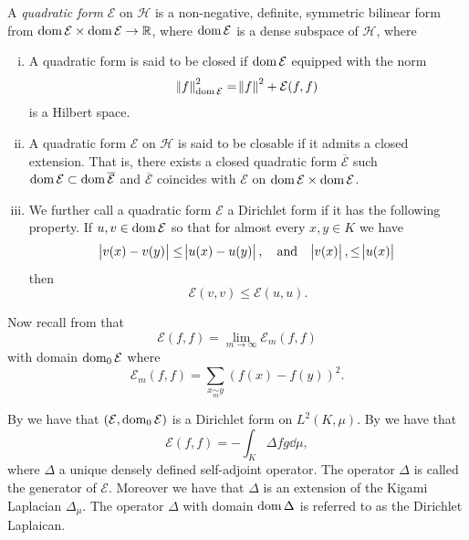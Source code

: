  \medskip
\begin{defi} A \emph{quadratic form} $\mathcal{E}$ on $\mathcal{H}$ is a non-negative, definite, symmetric bilinear form from $\operatorname{dom} \mathcal{E} \times \operatorname{dom} \mathcal{E} \to \mathbb{R}$, where $\operatorname{dom} \mathcal{E}$ is a dense subspace of $\mathcal{H}$, where
	
	\begin{enumerate}[(i)]		
		\item A quadratic form is said to be closed if $\operatorname{dom} \mathcal{E}$ equipped with the norm
		\begin{equation}
			\norm{f}^{2}_{\operatorname{dom} \mathcal{E}} = \norm{f}^2 + \mathcal{E}(f,f)
		\end{equation}
		is a Hilbert space.
		\item A quadratic form $\mathcal{E}$ on $\mathcal{H}$ is said to be closable if it admits a closed extension. That is, there exists a closed quadratic form $\overline{\mathcal{E}}$ such $\operatorname{dom} \mathcal{E} \subset \operatorname{dom} \overline{\mathcal{E}}$ and $\overline{\mathcal{E}}$ coincides with $\mathcal{E}$ on $\operatorname{dom} \mathcal{E} \times \operatorname{dom} \mathcal{E}$.
		\item  We further call a quadratic form $\mathcal{E}$ a Dirichlet form if it has the following property. If $u, v \in \operatorname{dom} \mathcal{E}$ so that for almost every $x,y \in K$ we have
		\begin{equation}\label{contraction}
		\abs{v(x) - v(y)} \leq \abs{u(x) - u(y)}, \quad \text{and} \quad \abs{v(x)}, \leq \abs{u(x)}
		\end{equation}
		then 
		\begin{equation}
			\mathcal{E}(v,v) \leq \mathcal{E}(u,u).
		\end{equation}
	\end{enumerate} 
\end{defi} 
 
 
 
\noi Now recall from  that 
\begin{equation}
	\mathcal{E}(f,f) = \lim_{m \to \infty} \mathcal{E}_m(f,f)
\end{equation}
with domain $\operatorname{dom}_{0} \mathcal{E}$ where
\begin{equation}
	\mathcal{E}_{m}(f,f) =  \sum_{x \underset{m}{\sim} y} (f(x)-f(y))^2.
\end{equation}

By \cite[Theorem 4.1]{specAnal}  we have that $(\mathcal{E}, \operatorname{dom}_{0}\mathcal{E})$ is a Dirichlet form on $L^{2}(K, \mu)$.  By \cite[Lemma 1.3.3]{fabriceDirichelt} we have that 
\begin{equation}
	\mathcal{E}(f,f) = - \int_{K}\Delta f g \dd \mu,
\end{equation}
where $\Delta$ a unique densely defined self-adjoint operator. The operator $\Delta$ is called the generator of $\mathcal{E}$. Moreover we have that $\Delta$ is an extension of the Kigami Laplacian $\Delta_{\mu}$. The operator $\Delta$ with domain $\operatorname{dom} \Delta$ is referred to as the Dirichlet Laplaican. 

